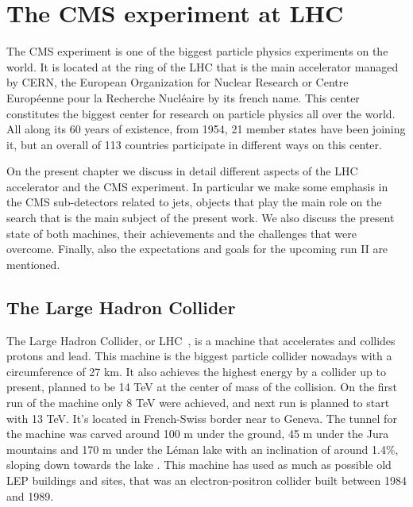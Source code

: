 \chapter[The CMS experiment at LHC]{The CMS experiment at LHC}

The CMS experiment is one of the biggest particle physics experiments on the world. It is located at the ring of the LHC that is the main accelerator managed by CERN, the European Organization for Nuclear Research or Centre Europ\'{e}enne pour la Recherche Nucl\'{e}aire by its french name. This center constitutes the biggest center for research on particle physics all over the world. All along its 60 years of existence, from 1954, 21 member states have been joining it, but an overall of 113 countries participate in different ways on this center. 

On the present chapter we discuss in detail different aspects of the LHC accelerator and the CMS experiment. In particular we make some emphasis in the CMS sub-detectors related to jets, objects that play the main role on the search that is the main subject of the present work. We also discuss the present state of both machines, their achievements and the challenges that were overcome. Finally, also the expectations and goals for the upcoming run II are mentioned.  

\section{The Large Hadron Collider}
\label{sec:LHC}

The Large Hadron Collider, or LHC~\cite{Bruning:782076}, is a machine that accelerates and collides protons and lead. This machine is the biggest particle collider nowadays with a circumference of 27 km. It also achieves the highest energy by a collider up to present, planned to be 14 TeV at the center of mass of the collision. On the first run of the machine only 8 TeV were achieved, and next run is planned to start with 13 TeV. It's located in French-Swiss border near to Geneva. The tunnel for the machine was carved around 100 m under the ground, 45 m under the Jura mountains and 170 m under the L\'{e}man lake with an inclination of around 1.4\%, sloping down towards the lake . This machine has used as much as possible old LEP buildings and sites, that was an electron-positron collider built between 1984 and 1989. 

